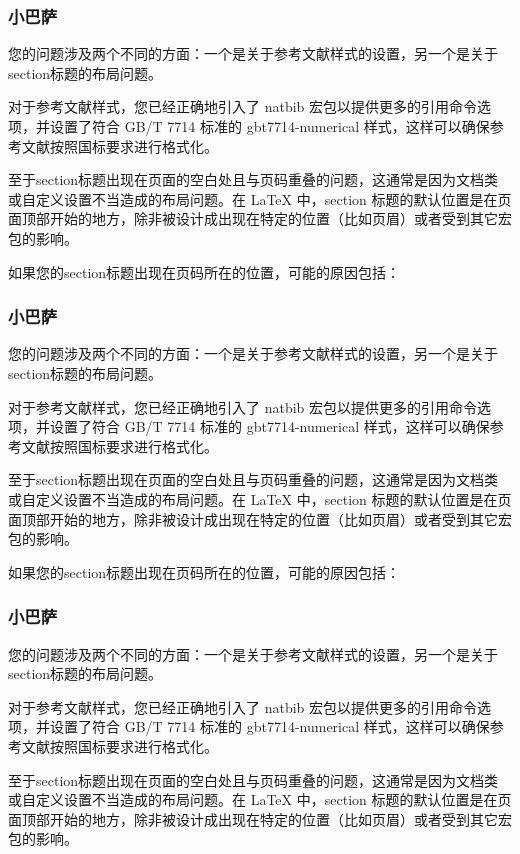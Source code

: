 \documentclass[a4paper]{ctexart}
\begin{document}
\subsubsection{小巴萨}

您的问题涉及两个不同的方面：一个是关于参考文献样式的设置，另一个是关于section标题的布局问题。

对于参考文献样式，您已经正确地引入了 natbib 宏包以提供更多的引用命令选项，并设置了符合 GB/T 7714 标准的 gbt7714-numerical 样式，这样可以确保参考文献按照国标要求进行格式化。

至于section标题出现在页面的空白处且与页码重叠的问题，这通常是因为文档类或自定义设置不当造成的布局问题。在 LaTeX 中，section 标题的默认位置是在页面顶部开始的地方，除非被设计成出现在特定的位置（比如页眉）或者受到其它宏包的影响。

如果您的section标题出现在页码所在的位置，可能的原因包括：

\subsubsection{小巴萨}

您的问题涉及两个不同的方面：一个是关于参考文献样式的设置，另一个是关于section标题的布局问题。

对于参考文献样式，您已经正确地引入了 natbib 宏包以提供更多的引用命令选项，并设置了符合 GB/T 7714 标准的 gbt7714-numerical 样式，这样可以确保参考文献按照国标要求进行格式化。

至于section标题出现在页面的空白处且与页码重叠的问题，这通常是因为文档类或自定义设置不当造成的布局问题。在 LaTeX 中，section 标题的默认位置是在页面顶部开始的地方，除非被设计成出现在特定的位置（比如页眉）或者受到其它宏包的影响。

如果您的section标题出现在页码所在的位置，可能的原因包括：

\subsubsection{小巴萨}

您的问题涉及两个不同的方面：一个是关于参考文献样式的设置，另一个是关于section标题的布局问题。

对于参考文献样式，您已经正确地引入了 natbib 宏包以提供更多的引用命令选项，并设置了符合 GB/T 7714 标准的 gbt7714-numerical 样式，这样可以确保参考文献按照国标要求进行格式化。

至于section标题出现在页面的空白处且与页码重叠的问题，这通常是因为文档类或自定义设置不当造成的布局问题。在 LaTeX 中，section 标题的默认位置是在页面顶部开始的地方，除非被设计成出现在特定的位置（比如页眉）或者受到其它宏包的影响。
\end{document}
